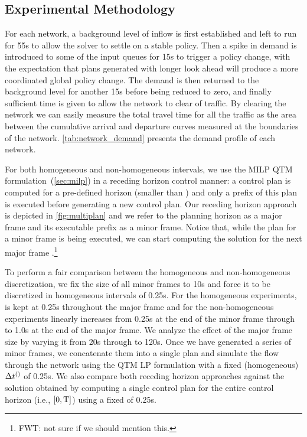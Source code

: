 \subsection{Experimental Methodology}

For each network, a background level of inflow is first established and left to
run for 55s to allow the solver to settle on a stable policy. Then a spike in
demand is introduced to some of the input queues for 15s to trigger a policy
change, with the expectation that plans generated with longer look ahead will
produce a more coordinated global policy change. The demand is then returned to
the background level for another 15s before being reduced to zero, and finally
sufficient time is given to allow the network to clear of traffic. By clearing
the network we can easily measure the total travel time for all the traffic as
the area between the cumulative arrival and departure curves measured at the
boundaries of the network. \cref{tab:network_demand} presents the demand profile
of each network.


For both homogeneous and non-homogeneous intervals, we use the MILP QTM
formulation~(\cref{sec:milp}) in a receding horizon control manner: a control
plan is computed for a pre-defined horizon (smaller than \TMAX) and only a
prefix of this plan is executed before generating a new control plan. 
%
Our receding horizon approach is depicted in \cref{fig:multiplan} and we refer
to the planning horizon as a major frame and its executable prefix as a minor
frame.
%
Notice that, while the plan for a minor frame is being executed, we can start
computing the solution for the next major frame .\footnote{FWT: not sure if we should mention this.}


To perform a fair comparison between the homogeneous and non-homogeneous
discretization, we fix the size of all minor frames to 10s and force it to be
discretized in homogeneous intervals of 0.25s.
%
For the homogeneous experiments, \DT[] is kept at 0.25s throughout the major
frame and for the non-homogeneous experiments  \DT[] linearly increases from
0.25s at the end of the minor frame through to 1.0s at the
end of the major frame.
%
We analyze the effect of the major frame size by varying it from 20s through to 
120s.
%
Once we have generated a series of minor frames, we concatenate them into a
single plan and simulate the flow through the network using the QTM LP
formulation with a fixed (homogeneous) $\DT[]$ of 0.25s.
%
%
We also compare both receding horizon approaches against the 
solution obtained by computing a single control plan for the entire control
horizon (i.e., $[0,\TMAX]$) using a fixed \DT[] of 0.25s.


